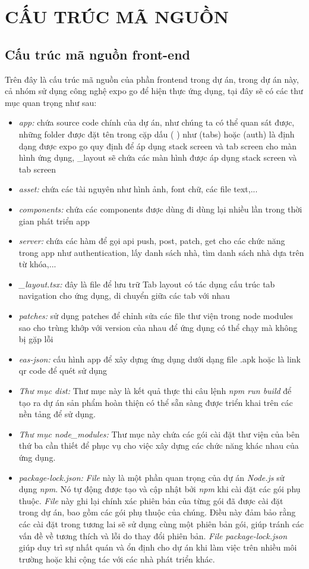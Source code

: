 \section{CẤU TRÚC MÃ NGUỒN}
\subsection{Cấu trúc mã nguồn front-end}
Trên đây là cấu trúc mã nguồn của phần frontend trong dự án, trong dự án này, cả nhóm sử dụng công nghệ expo go để hiện thực ứng dụng, tại đây sẽ có các thư mục quan trọng như sau:
\begin{itemize}
    \item \textit{app:} chứa source code chính của dự án, như chúng ta có thể quan sát được, những folder được đặt tên trong cặp dấu ( ) như (tabs) hoặc (auth) là định dạng được expo go quy định để áp dụng stack screen và tab screen cho màn hình ứng dụng, \_layout sẽ chứa các màn hình được áp dụng stack screen và tab screen
    \item \textit{asset:} chứa các tài nguyên như hình ảnh, font chữ, các file text,...
    \item \textit{components:} chứa các components được dùng đi dùng lại nhiều lần trong thời gian phát triển app
    \item \textit{server:} chứa các hàm để gọi api push, post, patch, get cho các chức năng trong app như authentication, lấy danh sách nhà, tìm danh sách nhà dựa trên từ khóa,...
    \item \textit{\_layout.tsx:} đây là file để lưu trữ Tab layout có tác dụng cấu trúc tab navigation cho ứng dụng, di chuyển giữa các tab với nhau
    \item \textit{patches:} sử dụng patches để chỉnh sửa các file thư viện trong node modules sao cho trùng khớp với version của nhau để ứng dụng có thể chạy mà không bị gặp lỗi
    \item \textit{eas-json:} cấu hình app để xây dựng ứng dụng dưới dạng file .apk hoặc là link qr code để quét sử dụng
    \item \textit{Thư mục dist:} Thư mục này là kết quả thực thi câu lệnh \textit{npm run build} để tạo ra dự án sản phẩm hoàn thiện có thể sẵn sàng được triển khai trên các nền tảng để sử dụng.
    \item \textit{Thư mục node\_modules:} Thư mục này chứa các gói cài đặt thư viện của bên thứ ba cần thiết để phục vụ cho việc xây dựng các chức năng khác nhau của ứng dụng.
    \item \textit{package-lock.json:} \textit{File} này là một phần quan trọng của dự án \textit{Node.js} sử dụng \textit{npm}. Nó tự động được tạo và cập nhật bởi \textit{npm} khi cài đặt các gói phụ thuộc. \textit{File} này ghi lại chính xác phiên bản của từng gói đã được cài đặt trong dự án, bao gồm các gói phụ thuộc của chúng. Điều này đảm bảo rằng các cài đặt trong tương lai sẽ sử dụng cùng một phiên bản gói, giúp tránh các vấn đề về tương thích và lỗi do thay đổi phiên bản. \textit{File} \textit{package-lock.json} giúp duy trì sự nhất quán và ổn định cho dự án khi làm việc trên nhiều môi trường hoặc khi cộng tác với các nhà phát triển khác.

\end{itemize}
